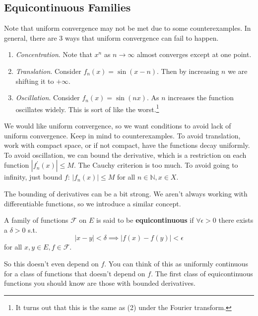 \subsection{Equicontinuous Families} 

  Note that uniform convergence may not be met due to some counterexamples. In general, there are 3 ways that uniform convergence can fail to happen. 

  \begin{enumerate}
    \item \textit{Concentration}. Note that $x^n$ as $n \to \infty$ almost converges except at one point. 
    \item \textit{Translation}. Consider $f_n (x) = \sin(x - n)$. Then by increasing $n$ we are shifting it to $+\infty$. 
    \item \textit{Oscillation}. Consider $f_n (x) = \sin(nx)$. As $n$ increases the function oscillates widely. This is sort of like the worst.\footnote{It turns out that this is the same as (2) under the Fourier transform.} 
  \end{enumerate}

  We would like uniform convergence, so we want conditions to avoid lack of uniform convergence. Keep in mind to counterexamples. To avoid translation, work with compact space, or if not compact, have the functions decay uniformly. To avoid oscillation, we can bound the derivative, which is a restriction on each function $|f_n^\prime (x)| \leq M$. The Cauchy criterion is too much. To avoid going to infinity, just bound $f$: $|f_n (x)| \leq M$ for all $n \in \mathbb{N}, x \in X$. 

  The bounding of derivatives can be a bit strong. We aren't always working with differentiable functions, so we introduce a similar concept. 

  \begin{definition}
    A family of functions $\mathcal{F}$ on $E$ is said to be \textbf{equicontinuous} if $\forall \epsilon > 0$ there exists a $\delta > 0$ s.t. 
    \begin{equation}
      |x - y| < \delta \implies |f(x) - f(y)| < \epsilon
    \end{equation}
    for all $x, y \in E, f \in \mathcal{F}$. 
  \end{definition}

  So this doesn't even depend on $f$. You can think of this as uniformly continuous for a class of functions that doesn't depend on $f$. The first class of equicontinuous functions you should know are those with bounded derivatives. 

